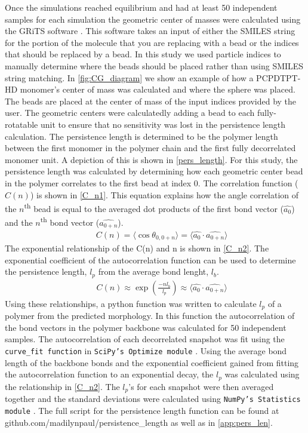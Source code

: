 Once the simulations reached equilibrium and had at least 50 independent samples for each simulation the geometric center of masses were calculated using the GRiTS software \citep{grits}. This software takes an input of either the SMILES string for the portion of the molecule that you are replacing with a bead or the indices that should be replaced by a bead. In this study we used particle indices to manually determine where the beads should be placed rather than using SMILES string matching. In \autoref{fig:CG_diagram} we show an example of how a PCPDTPT-HD monomer's center of mass was calculated and where the sphere was placed. The beads are placed at the center of mass of the input indices provided by the user. The geometric centers were calculatedly adding a bead to each fully-rotatable unit to ensure that no sensitivity was lost in the persistence length calculation. 
The persistence length is determined to be the polymer length between the first monomer in the polymer chain and the first fully decorrelated monomer unit. A depiction of this is shown in \autoref{pers_length}. 
For this study, the persistence length was calculated by determining how each geometric center bead in the polymer correlates to the first bead at index 0. The correlation function ($C(n)$) is shown in \autoref{C_n1}. This equation explains how the angle correlation of the $n$\textsuperscript{th} bead is equal to the averaged dot products of the first bond vector ($\hat{a_{0}}$) and the $n$\textsuperscript{th} bond vector ($\hat{a_{0+n}}$). 
\begin{eqnarray}
  &&C(n) = \langle \cos{\theta_{0,0+n}} \rangle = \langle \hat{a_{0}} \cdot \hat{a_{0+n}} \rangle
  \label{C_n1}
\end{eqnarray}
The exponential relationship of the C(n) and n is shown in \autoref{C_n2}. The exponential coefficient of the autocorrelation function can be used to determine the persistence length, $l_p$ from the average bond lenght, $l_{b}$. 
\begin{eqnarray}
  &&C(n) \approx  \exp{\left(\frac{- n l_{b}}{l_{p}}\right)}  \approx \langle \hat{a_{0}} \cdot \hat{a_{0+n}} \rangle
  \label{C_n2}
\end{eqnarray}
Using these relationships, a python function was written to calculate $l_p$ of a polymer from the predicted morphology. In this function the autocorrelation of the bond vectors in the polymer backbone was calculated for 50 independent samples. The autocorrelation of each decorrelated snapshot was fit using the \texttt{curve\_fit function} in \texttt{SciPy's Optimize module} \citep{2020SciPy-NMeth}. Using the average bond length of the backbone bonds and the exponential coefficient gained from fitting the autocorrelation function to an exponential decay, the $l_p$ was calculated using the relationship in \autoref{C_n2}. The $l_p$'s for each snapshot were then averaged together and the standard deviations were calculated using \texttt{NumPy's Statistics module} \citep{numpy}. The full script for the persistence length function can be found at github.com/madilynpaul/persistence\_length as well as in \autoref{app:pers_len}. 
